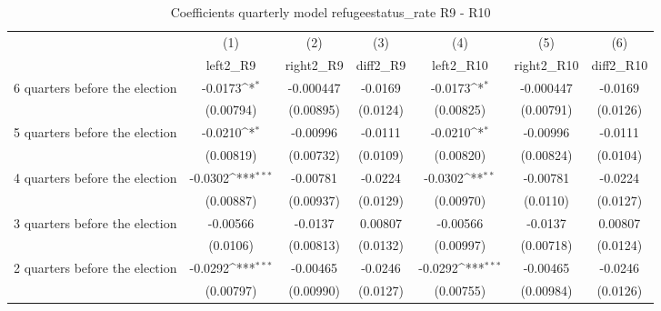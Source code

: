 \begin{table}[!ht]\centering \footnotesize
\def\sym#1{\ifmmode^{#1}\else\(^{#1}\)\fi}
\caption{Coefficients quarterly model refugeestatus\_rate R9 - R10}
\begin{tabular}{l*{6}{c}}
\hline\hline
                    &\multicolumn{1}{c}{(1)}&\multicolumn{1}{c}{(2)}&\multicolumn{1}{c}{(3)}&\multicolumn{1}{c}{(4)}&\multicolumn{1}{c}{(5)}&\multicolumn{1}{c}{(6)}\\
                    &\multicolumn{1}{c}{left2\_R9}&\multicolumn{1}{c}{right2\_R9}&\multicolumn{1}{c}{diff2\_R9}&\multicolumn{1}{c}{left2\_R10}&\multicolumn{1}{c}{right2\_R10}&\multicolumn{1}{c}{diff2\_R10}\\
\hline
 6 quarters before the election&     -0.0173\sym{*}  &   -0.000447         &     -0.0169         &     -0.0173\sym{*}  &   -0.000447         &     -0.0169         \\
                    &   (0.00794)         &   (0.00895)         &    (0.0124)         &   (0.00825)         &   (0.00791)         &    (0.0126)         \\
[1em]
 5 quarters before the election&     -0.0210\sym{*}  &    -0.00996         &     -0.0111         &     -0.0210\sym{*}  &    -0.00996         &     -0.0111         \\
                    &   (0.00819)         &   (0.00732)         &    (0.0109)         &   (0.00820)         &   (0.00824)         &    (0.0104)         \\
[1em]
 4 quarters before the election&     -0.0302\sym{***}&    -0.00781         &     -0.0224         &     -0.0302\sym{**} &    -0.00781         &     -0.0224         \\
                    &   (0.00887)         &   (0.00937)         &    (0.0129)         &   (0.00970)         &    (0.0110)         &    (0.0127)         \\
[1em]
 3 quarters before the election&    -0.00566         &     -0.0137         &     0.00807         &    -0.00566         &     -0.0137         &     0.00807         \\
                    &    (0.0106)         &   (0.00813)         &    (0.0132)         &   (0.00997)         &   (0.00718)         &    (0.0124)         \\
[1em]
 2 quarters before the election&     -0.0292\sym{***}&    -0.00465         &     -0.0246         &     -0.0292\sym{***}&    -0.00465         &     -0.0246         \\
                    &   (0.00797)         &   (0.00990)         &    (0.0127)         &   (0.00755)         &   (0.00984)         &    (0.0126)         \\

\end{tabular}
\end{table}
